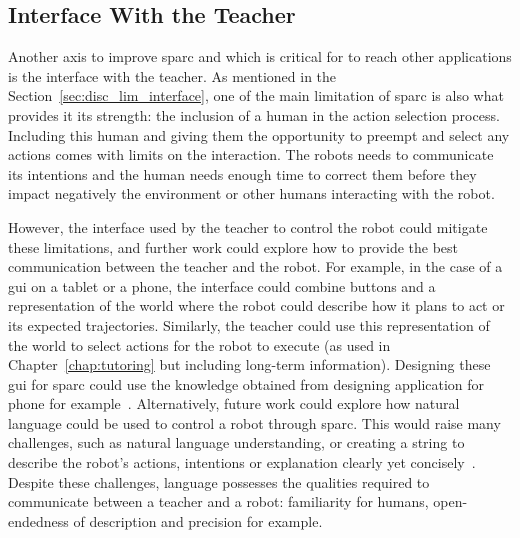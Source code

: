 \subsection{Interface With the Teacher}

Another axis to improve \gls{sparc} and which is critical for to reach other applications is the interface with the teacher. As mentioned in the Section~\ref{sec:disc_lim_interface}, one of the main limitation of \gls{sparc} is also what provides it its strength: the inclusion of a human in the action selection process. Including this human and giving them the opportunity to preempt and select any actions comes with limits on the interaction. The robots needs to communicate its intentions and the human needs enough time to correct them before they impact negatively the environment or other humans interacting with the robot. %

However, the interface used by the teacher to control the robot could mitigate these limitations, and further work could explore how to provide the best communication between the teacher and the robot. For example, in the case of a \gls{gui} on a tablet or a phone, the interface could combine buttons and a representation of the world where the robot could describe how it plans to act or its expected trajectories. Similarly, the teacher could use this representation of the world to select actions for the robot to execute (as used in Chapter~\ref{chap:tutoring} but including long-term information). Designing these \gls{gui} for \gls{sparc} could use the knowledge obtained from designing application for phone for example~\citep{joorabchi2013real}. Alternatively, future work could explore how natural language could be used to control a robot through \gls{sparc}. This would raise many challenges, such as natural language understanding, or creating a string to describe the robot's actions, intentions or explanation clearly yet concisely~\citep{hayes2017improving}. Despite these challenges, language possesses the qualities required to communicate between a teacher and a robot: familiarity for humans, open-endedness of description and precision for example. 

